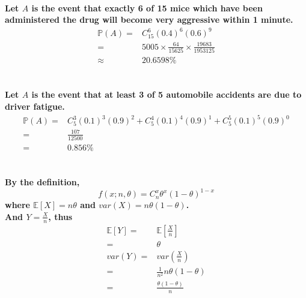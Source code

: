 \documentclass{article}
\begin{document}
        \paragraph{
            Let $A$ is the event that  exactly 6 of 15 mice which have been administered the drug will become very aggressive within 1 minute.
            \begin{equation*}
                \begin{split}
                    \mathbb{P}(A)=&C_{15}^6(0.4)^6(0.6)^9\\
                        =&5005\times \frac{64}{15625}\times \frac{19683}{1953125}\\
                        \approx&20.6598\%
                \end{split}
            \end{equation*}
        }

    \section{}
        \paragraph{
            Let $A$ is the event that at least 3 of 5 automobile accidents are due to driver fatigue.
            \begin{equation*}
                \begin{split}
                    \mathbb{P}(A)=&C_{5}^3(0.1)^3(0.9)^2+C_{5}^4(0.1)^4(0.9)^1+C_{5}^5(0.1)^5(0.9)^0\\
                        =&\frac{107}{12500}\\
                        =&0.856\%
                \end{split}
            \end{equation*}
        }

    \section{}
        \paragraph{
             By the definition,
             $$f(x;n,\theta)=C_n^x\theta^x(1-\theta)^{1-x}$$ where $\mathbb{E}[X]=n\theta$ and $var(X)=n\theta(1-\theta)$.\\
             And $Y=\frac{X}{n}$, thus 
             \begin{equation*}
                 \begin{split}
                    \mathbb{E}[Y]=&\mathbb{E}[\frac{X}{n}]\\
                        =&\theta\\
                    var(Y)=&var(\frac{X}{n})\\
                        =&\frac{1}{n^2}n\theta(1-\theta)\\
                        =&\frac{\theta(1-\theta)}{n}\\
                 \end{split}
             \end{equation*}
        }
\end{document}
